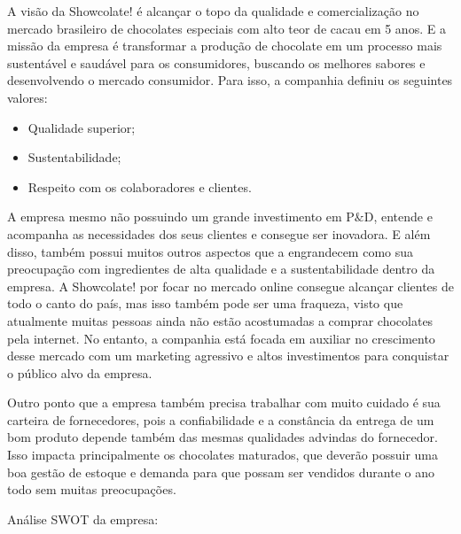 \documentclass[
	12pt,				%
	openright,			%
	oneside,			%
	a4paper,			%
	english,			%
	french,				%
	spanish,			%
	brazil				%
	]{abntex2}
\begin{document}
A visão da Showcolate! é alcançar o topo da qualidade e comercialização no mercado brasileiro de chocolates especiais com alto teor de cacau em 5 anos. E a missão da empresa é transformar a produção de chocolate em um processo mais sustentável e saudável para os consumidores, buscando os melhores sabores e desenvolvendo o mercado consumidor. Para isso, a companhia definiu os seguintes valores:

\begin{itemize}
\item Qualidade superior;
\item Sustentabilidade;
\item Respeito com os colaboradores e clientes.
\end{itemize}

A empresa mesmo não possuindo um grande investimento em P$\&$D, entende e acompanha as necessidades dos seus clientes e consegue ser inovadora. E além disso, também possui muitos outros aspectos que a engrandecem como sua preocupação com ingredientes de alta qualidade e a sustentabilidade dentro da empresa. A Showcolate! por focar no mercado online consegue alcançar clientes de todo o canto do país, mas isso também pode ser uma fraqueza, visto que atualmente muitas pessoas ainda não estão acostumadas a comprar chocolates pela internet. No entanto, a companhia está focada em auxiliar no crescimento desse mercado com um marketing agressivo e altos investimentos para conquistar o público alvo da empresa.
	
Outro ponto que a empresa também precisa trabalhar com muito cuidado é sua carteira de fornecedores, pois a confiabilidade e a constância da entrega de um bom produto depende também das mesmas qualidades advindas do fornecedor. Isso impacta principalmente os chocolates maturados, que deverão possuir uma boa gestão de estoque e demanda para que possam ser vendidos durante o ano todo sem muitas preocupações.

Análise SWOT da empresa:
\end{document}
